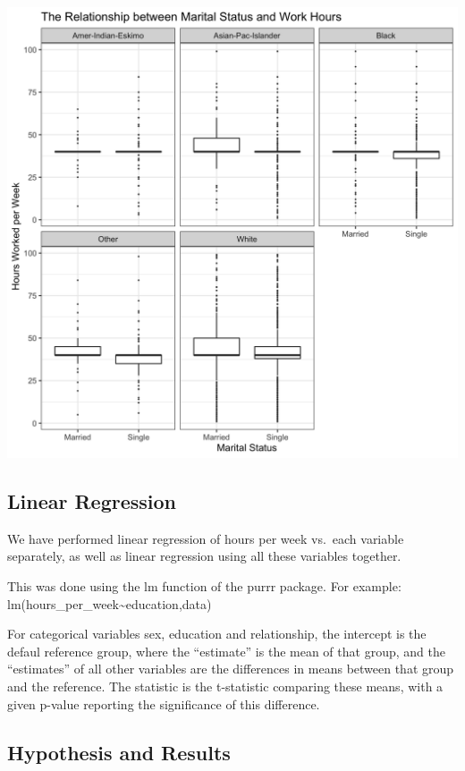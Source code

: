\documentclass[]{article}
\begin{document}
\includegraphics{../images/Plot_4_Marital_Status_and_Work_Hours.png}

\hypertarget{linear-regression}{%
\subsection{Linear Regression}\label{linear-regression}}

We have performed linear regression of hours per week vs.~each variable
separately, as well as linear regression using all these variables
together.

This was done using the lm function of the purrr package. For example:
lm(hours\_per\_week\textasciitilde education,data)

For categorical variables sex, education and relationship, the intercept
is the defaul reference group, where the ``estimate'' is the mean of
that group, and the ``estimates'' of all other variables are the
differences in means between that group and the reference. The statistic
is the t-statistic comparing these means, with a given p-value reporting
the significance of this difference.

\hypertarget{hypothesis-and-results}{%
\subsection{Hypothesis and Results}\label{hypothesis-and-results}}
\end{document}
